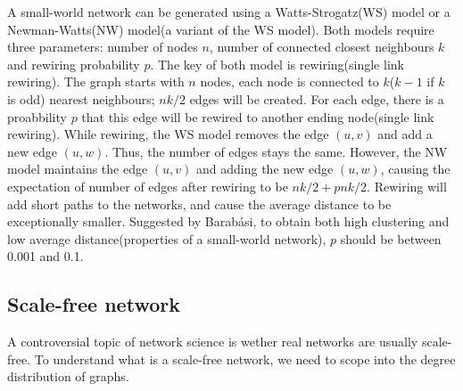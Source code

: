 \documentclass[12pt]{article}
\begin{document}
{A small-world network can be generated using a Watts-Strogatz(WS) model\cite{wsmodel} or a Newman-Watts(NW) model(a variant of the WS model)\cite{nwmodel}. Both models require three parameters: number of nodes $n$, number of connected closest neighbours $k$ and rewiring probability $p$. The key of both model is rewiring(single link rewiring). The graph starts with $n$ nodes, each node is connected to $k$($k-1$ if $k$ is odd) nearest neighbours; $nk/2$ edges will be created. For each edge, there is a proabbility $p$ that this edge will be rewired to another ending node(single link rewiring). While rewiring, the WS model removes the edge $(u,v)$ and add a new edge $(u,w)$. Thus, the number of edges stays the same. However, the NW model maintains the edge $(u,v)$ and adding the new edge $(u,w)$, causing the expectation of number of edges after rewiring to be $nk/2+pnk/2$. Rewiring will add short paths to the networks, and cause the average distance to be exceptionally smaller. Suggested by Barabási\cite{barabási2016network}, to obtain both high clustering and low average distance(properties of a small-world network), $p$ should be between 0.001 and 0.1.\\


\subsection{Scale-free network}
A controversial topic of network science is wether real networks are usually scale-free\cite{holme2019rare}. To understand what is a scale-free network, we need to scope into the degree distribution of graphs.\\

}
\end{document}

